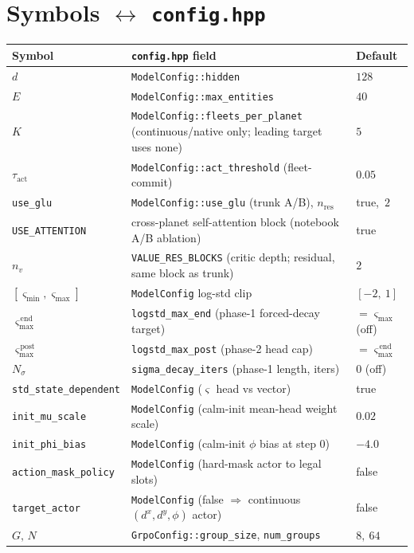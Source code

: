 \documentclass[11pt]{article}
\begin{document}
\section{Symbols $\leftrightarrow$ \texttt{config.hpp}}
\begin{center}\small
\begin{tabular}{@{}lll@{}}
\toprule
Symbol & \texttt{config.hpp} field & Default \\
\midrule
$d$ & \texttt{ModelConfig::hidden} & $128$ \\
$E$ & \texttt{ModelConfig::max\_entities} & $40$ \\
$K$ & \texttt{ModelConfig::fleets\_per\_planet} (continuous/native only; leading target uses none) & $5$ \\
$\tau_{\mathrm{act}}$ & \texttt{ModelConfig::act\_threshold} (fleet-commit) & $0.05$ \\
\texttt{use\_glu} & \texttt{ModelConfig::use\_glu} (trunk A/B), $n_{\mathrm{res}}$ & true,\ $2$ \\
\texttt{USE\_ATTENTION} & cross-planet self-attention block (notebook A/B ablation) & true \\
$n_v$ & \texttt{VALUE\_RES\_BLOCKS} (critic depth; residual, same block as trunk) & $2$ \\
$[\varsigma_{\min},\varsigma_{\max}]$ & \texttt{ModelConfig} log-std clip & $[-2,\ 1]$ \\
$\varsigma_{\max}^{\,\mathrm{end}}$ & \texttt{logstd\_max\_end} (phase-1 forced-decay target) & $=\varsigma_{\max}$ (off) \\
$\varsigma_{\max}^{\,\mathrm{post}}$ & \texttt{logstd\_max\_post} (phase-2 head cap) & $=\varsigma_{\max}^{\,\mathrm{end}}$ \\
$N_{\sigma}$ & \texttt{sigma\_decay\_iters} (phase-1 length, iters) & $0$ (off) \\
\texttt{std\_state\_dependent} & \texttt{ModelConfig} (\(\varsigma\) head vs vector) & true \\
\texttt{init\_mu\_scale} & \texttt{ModelConfig} (calm-init mean-head weight scale) & $0.02$ \\
\texttt{init\_phi\_bias} & \texttt{ModelConfig} (calm-init $\phi$ bias at step $0$) & $-4.0$ \\
\texttt{action\_mask\_policy} & \texttt{ModelConfig} (hard-mask actor to legal slots) & false \\
\texttt{target\_actor} & \texttt{ModelConfig} (false $\Rightarrow$ continuous $(d^x,d^y,\phi)$ actor) & false \\
$G,\,N$ & \texttt{GrpoConfig::group\_size}, \texttt{num\_groups} & $8,\ 64$ \\

\end{tabular}
\end{center}
\end{document}
